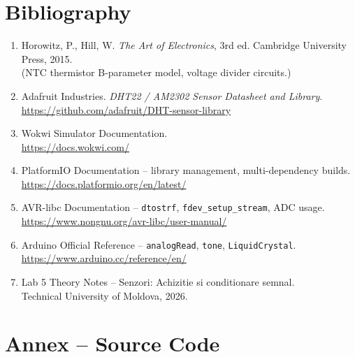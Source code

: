 \documentclass[12pt]{article}
\begin{document}
\section*{Bibliography}
\begin{enumerate}
    \item Horowitz, P., Hill, W. \textit{The Art of Electronics}, 3rd ed. Cambridge University Press, 2015.\\
    (NTC thermistor B-parameter model, voltage divider circuits.)

    \item Adafruit Industries. \textit{DHT22 / AM2302 Sensor Datasheet and Library}.\\
    \url{https://github.com/adafruit/DHT-sensor-library}

    \item Wokwi Simulator Documentation.\\
    \url{https://docs.wokwi.com/}

    \item PlatformIO Documentation -- library management, multi-dependency builds.\\
    \url{https://docs.platformio.org/en/latest/}

    \item AVR-libc Documentation -- \texttt{dtostrf}, \texttt{fdev\_setup\_stream}, ADC usage.\\
    \url{https://www.nongnu.org/avr-libc/user-manual/}

    \item Arduino Official Reference -- \texttt{analogRead}, \texttt{tone}, \texttt{LiquidCrystal}.\\
    \url{https://www.arduino.cc/reference/en/}

    \item Lab 5 Theory Notes -- Senzori: Achizitie si conditionare semnal.\\
    Technical University of Moldova, 2026.
\end{enumerate}

\pagebreak
\section*{Annex -- Source Code}
\end{document}
